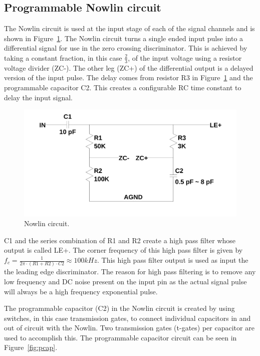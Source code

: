 \documentclass[12pt,oneside,final]{siuethesis}
\theoremstyle{definition}
\begin{document}
\subsection{Programmable Nowlin circuit}
\par The Nowlin circuit is used at the input stage of each of the signal channels and is shown in Figure~\ref{fig:Nowlin}. The Nowlin circuit turns a single ended input pulse into a differential signal for use in the zero crossing discriminator. This is achieved by taking a constant fraction, in this case $\frac{2}{3}$, of the input voltage using a resistor voltage divider (ZC-). The other leg (ZC+) of the differential output is a delayed version of the input pulse. The delay comes from resistor R3 in Figure~\ref{fig:Nowlin} and the programmable capacitor C2. This creates a configurable RC time constant to delay the input signal. 
\begin{figure}[ht]
\centering
\includegraphics[scale=.3,keepaspectratio=true]{../LTspice_Drawings/nowlin/nowlin.png} 
\caption{Nowlin circuit.}
\label{fig:Nowlin}
\end{figure}
\par C1 and the series combination of R1 and R2 create a high pass filter whose output is called LE+. The corner frequency of this high pass filter is given by $f_{c} = \frac{1}{2\pi \cdot(R1+R2)\cdot C2} \approx 100 kHz$. This high pass filter output is used as input the the leading edge discriminator. The reason for high pass filtering is to remove any low frequency and DC noise present on the input pin as the actual signal pulse will always be a high frequency exponential pulse.
\par The programmable capacitor (C2) in the Nowlin circuit is created by using switches, in this case transmission gates, to connect individual capacitors in and out of circuit with the Nowlin. Two transmission gates (t-gates) per capacitor are used to accomplish this. The programmable capacitor circuit can be seen in Figure~\ref{fig:pcap}.
\end{document}
